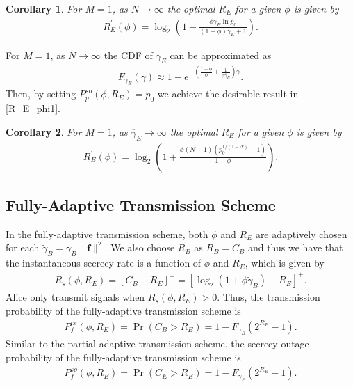 \documentclass[journal]{IEEEtran}
\newtheorem{corollary}{\noindent \textbf{Corollary}}
\begin{document}
\begin{corollary}
For $M = 1$, as $N \rightarrow \infty$ the optimal $R_E$ for a given $\phi$ is given by
\begin{align}\label{R_E_phi1}
R_E^{\prime} (\phi) = \log_2\left(1-\frac{\phi \overline{\gamma}_E \ln p_0}{(1-\phi)\overline{\gamma}_E + 1}\right).
\end{align}
\end{corollary}
\begin{IEEEproof}
For $M = 1$, as $N \rightarrow \infty$ the CDF of $\gamma_E$ can be approximated as
\begin{align}
F_{\gamma_{E}}\left(\gamma\right) \approx 1 - e^{-\left(\frac{1-\phi}{\phi} + \frac{1}{\phi \overline{\gamma}_E}\right) \gamma}.
\end{align}
Then, by setting $P^{so}_p(\phi, R_E) = p_0$ we achieve the desirable result in \eqref{R_E_phi1}.
\end{IEEEproof}

\begin{corollary}
For $M = 1$, as $\overline{\gamma}_E \rightarrow \infty$ the optimal $R_E$ for a given $\phi$ is given by
\begin{align}
R_E^{\prime} (\phi) = \log_2\left(1+\frac{\phi (N-1) \left(p_0^{{1}/{(1-N)}}-1\right)}{1-\phi}\right).
\end{align}
\end{corollary}





\subsection{Fully-Adaptive Transmission Scheme}

In the fully-adaptive transmission scheme, both $\phi$ and $R_E$ are adaptively chosen for each $\widetilde{\gamma}_B = \overline{\gamma}_B \|\mathbf{f}\|^2$. We also choose $R_B$ as $R_B = C_B$ and thus we have that the instantaneous secrecy rate is a function of $\phi$ and $R_E$, which is given by
\begin{align}\label{Rs_fully}
R_s(\phi, R_E) = [C_B \!-\! R_E]^{+} = \left[\log_2(1+\phi \widetilde{\gamma}_B) \!-\! R_E\right]^{+}.
\end{align}
Alice only transmit signals when $R_s(\phi, R_E) >0$. Thus, the transmission probability of the fully-adaptive transmission scheme is
\begin{align}
P^{tx}_f(\phi, R_E) = \Pr(C_B > R_E) = 1-F_{\gamma_B}\left(2^{R_E}-1\right).
\end{align}
Similar to the partial-adaptive transmission scheme, the secrecy outage probability of the fully-adaptive transmission scheme is
\begin{align}
P^{so}_f(\phi, R_E) = \Pr(C_E > R_E) = 1\!-\!F_{\gamma_E}\left(2^{R_E}\!-\!1\right).
\end{align}
\end{document}
